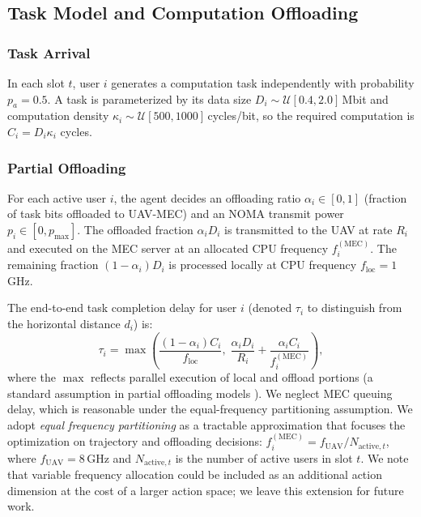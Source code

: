 \documentclass[journal]{IEEEtran}
\newcommand{\uav}{\text{UAV}}
\newcommand{\mec}{\text{MEC}}
\begin{document}
\subsection{Task Model and Computation Offloading}

\subsubsection{Task Arrival}
In each slot $t$, user $i$ generates a computation task independently
with probability $p_a = 0.5$.
A task is parameterized by its data size $D_i \sim \mathcal{U}[0.4, 2.0]$\,Mbit
and computation density $\kappa_i \sim \mathcal{U}[500, 1000]$\,cycles/bit,
so the required computation is $C_i = D_i \kappa_i$ cycles.

\subsubsection{Partial Offloading}
For each active user $i$, the agent decides an offloading ratio
$\alpha_i \in [0,1]$ (fraction of task bits offloaded to UAV-MEC)
and an NOMA transmit power $p_i \in [0, p_{\max}]$.
The offloaded fraction $\alpha_i D_i$ is transmitted to the UAV
at rate $R_i$ and executed on the MEC server at an allocated
CPU frequency $f_i^{(\mec)}$.
The remaining fraction $(1-\alpha_i) D_i$ is processed locally at
CPU frequency $f_{\text{loc}} = 1$\,GHz.

The end-to-end task completion delay for user $i$ (denoted
$\tau_i$ to distinguish from the horizontal distance $d_i$) is:
\begin{equation}
  \tau_i = \max\!\left(
    \frac{(1-\alpha_i)C_i}{f_{\text{loc}}},\;
    \frac{\alpha_i D_i}{R_i} + \frac{\alpha_i C_i}{f_i^{(\mec)}}
  \right),
  \label{eq:delay}
\end{equation}
where the $\max$ reflects parallel execution of local and
offload portions (a standard assumption in partial offloading
models \cite{liu2021uav_mec_survey}).
We neglect MEC queuing delay, which is reasonable under the
equal-frequency partitioning assumption.
We adopt \emph{equal frequency partitioning} as a tractable
approximation that focuses the optimization on trajectory and
offloading decisions:
$f_i^{(\mec)} = f_{\uav} / N_{\text{active},t}$,
where $f_{\uav} = 8$\,GHz and $N_{\text{active},t}$ is the number
of active users in slot $t$.
We note that variable frequency allocation could be included as
an additional action dimension at the cost of a larger action space;
we leave this extension for future work.
\end{document}
